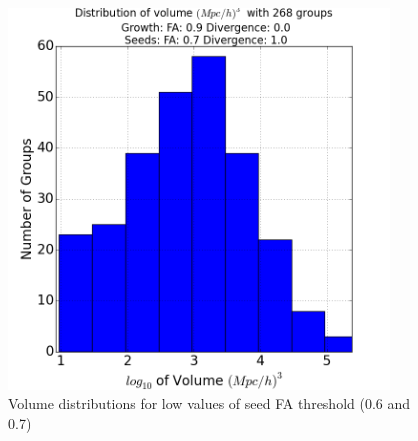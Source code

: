 \documentclass[12pt]{article}
\begin{document}
\begin{figure}[ht]
\begin{minipage}{.5\textwidth}
  \includegraphics[width=0.9\textwidth]{groups/volumeplots/volumes_distr_Mpc_07_Trace_10_search_FA_09_Trace_00.png}
\end{minipage}
\label{fg:volume_plots_higher}
\caption{Volume distributions for low values of seed FA threshold (0.6 and 0.7)}
\end{figure}
\FloatBarrier
\end{document}
